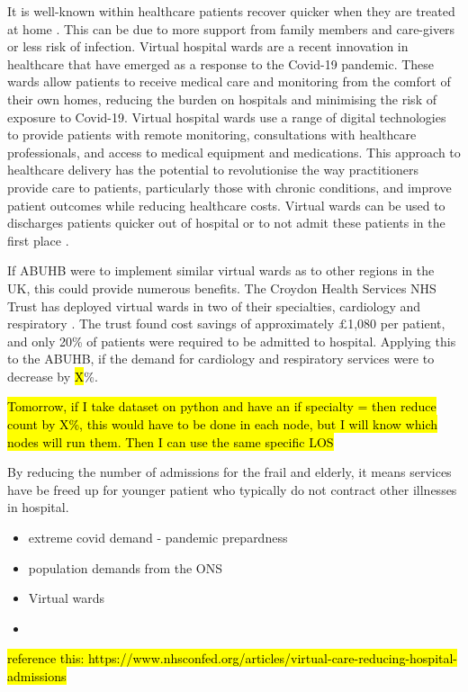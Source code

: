 \documentclass[../thesis.tex]{subfiles}
\begin{document}
It is well-known within healthcare patients recover quicker when they are treated at home \cite{CHNFT2022}. This can be due to more support from family members and care-givers or less risk of infection. Virtual hospital wards are a recent innovation in healthcare that have emerged as a response to the Covid-19 pandemic. These wards allow patients to receive medical care and monitoring from the comfort of their own homes, reducing the burden on hospitals and minimising the risk of exposure to Covid-19. Virtual hospital wards use a range of digital technologies to provide patients with remote monitoring, consultations with healthcare professionals, and access to medical equipment and medications. This approach to healthcare delivery has the potential to revolutionise the way practitioners provide care to patients, particularly those with chronic conditions, and improve patient outcomes while reducing healthcare costs. Virtual wards can be used to discharges patients quicker out of hospital or to not admit these patients in the first place \cite{Trueland2023}.

If ABUHB were to implement similar virtual wards as to other regions in the UK, this could provide numerous benefits. The Croydon Health Services NHS Trust has deployed virtual wards in two of their specialties, cardiology and respiratory \cite{HINSL2021}. The trust found cost savings of approximately $\pounds$1,080 per patient, and only 20\% of patients were required to be admitted to hospital. Applying this to the ABUHB, if the demand for cardiology and respiratory services were to decrease by \hl{X}\%.

\hl{Tomorrow, if I take dataset on python and have an if specialty = then reduce count by X\%, this would have to be done in each node, but I will know which nodes will run them. Then I can use the same specific LOS}

By reducing the number of admissions for the frail and elderly, it means services have be freed up for younger patient who typically do not contract other illnesses in hospital.
\begin{itemize}
    \item extreme covid demand - pandemic prepardness
\end{itemize}

\begin{itemize}
    \item population demands from the ONS
    \item Virtual wards
    \item 
\end{itemize}
\hl{reference this: https://www.nhsconfed.org/articles/virtual-care-reducing-hospital-admissions}
\end{document}
